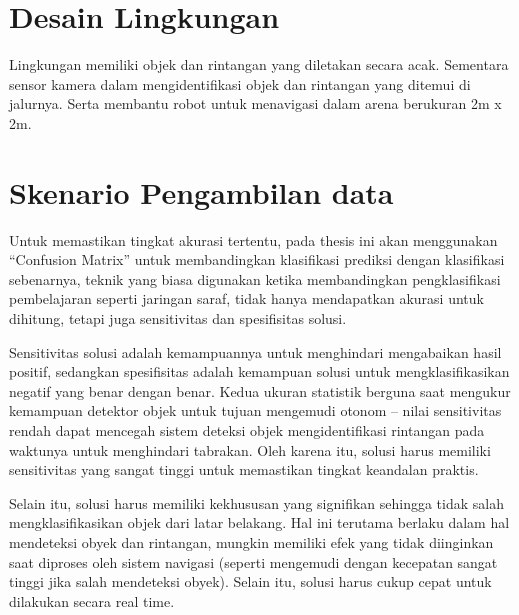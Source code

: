 \section{Desain Lingkungan}
Lingkungan memiliki objek dan rintangan yang diletakan secara acak.  Sementara sensor kamera dalam mengidentifikasi objek dan rintangan yang ditemui di jalurnya. Serta membantu robot untuk menavigasi dalam arena berukuran 2m x 2m.






\section{Skenario Pengambilan data}



Untuk memastikan tingkat akurasi tertentu, pada thesis ini akan menggunakan “Confusion Matrix” untuk membandingkan klasifikasi prediksi dengan klasifikasi sebenarnya, teknik yang biasa digunakan ketika membandingkan pengklasifikasi pembelajaran seperti jaringan saraf, tidak hanya mendapatkan akurasi untuk dihitung, tetapi juga sensitivitas dan spesifisitas solusi. 

Sensitivitas solusi adalah kemampuannya untuk menghindari mengabaikan hasil positif, sedangkan spesifisitas adalah kemampuan solusi untuk mengklasifikasikan negatif yang benar dengan benar. Kedua ukuran statistik berguna saat mengukur kemampuan detektor objek untuk tujuan mengemudi otonom – nilai sensitivitas rendah dapat mencegah sistem deteksi objek mengidentifikasi rintangan pada waktunya untuk menghindari tabrakan. Oleh karena itu, solusi harus memiliki sensitivitas yang sangat tinggi untuk memastikan tingkat keandalan praktis.

Selain itu, solusi harus memiliki kekhususan yang signifikan sehingga tidak salah mengklasifikasikan objek dari latar belakang. Hal ini terutama berlaku dalam hal mendeteksi obyek dan rintangan,  mungkin memiliki efek yang tidak diinginkan saat diproses oleh sistem navigasi (seperti mengemudi dengan kecepatan sangat tinggi jika salah mendeteksi obyek).
Selain itu, solusi harus cukup cepat untuk dilakukan secara real time. 



